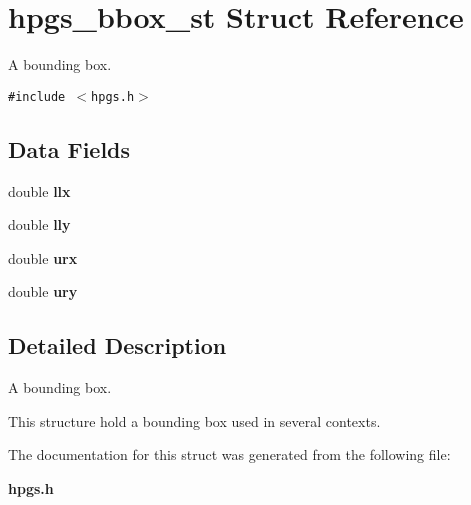 \section{hpgs\_\-bbox\_\-st Struct Reference}
\label{structhpgs__bbox__st}
A bounding box.  


{\tt \#include $<$hpgs.h$>$}

\subsection*{Data Fields}
\begin{CompactItemize}
\item 
double \textbf{llx}\label{structhpgs__bbox__st_aff8aadd54c02b116b041c4517eefee6}

\item 
double \textbf{lly}\label{structhpgs__bbox__st_fd888b275dbed90bda74c001d45893bb}

\item 
double \textbf{urx}\label{structhpgs__bbox__st_0ed6074f88e1de231a078ce0396cc517}

\item 
double \textbf{ury}\label{structhpgs__bbox__st_128adb72fc1967d1c5c55c18b4cb6a02}

\end{CompactItemize}


\subsection{Detailed Description}
A bounding box. 

This structure hold a bounding box used in several contexts. 

The documentation for this struct was generated from the following file:\begin{CompactItemize}
\item 
{\bf hpgs.h}\end{CompactItemize}
